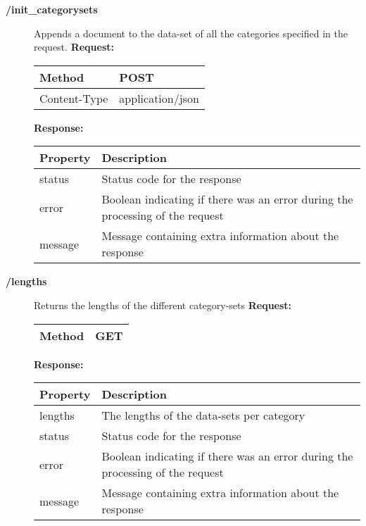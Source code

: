 \begin{description}
\item[\textbf{/init\_categorysets}]
Appends a document to the data-set of all the categories specified in the request.
\newline
\newline
\textbf{Request:}
\newline
\newline
\begin{tabular}{ | l | l |}
\hline
Method & POST\\ \hline
Content-Type & application/json\\ \hline
\end{tabular}
\newline
\newline
\textbf{Response:}
\newline
\newline
\resizebox{\textwidth}{!} {
\begin{tabular}{ | l | l |}
\hline
\textbf{Property} & \textbf{Description}\\ \hline
status & Status code for the response\\ \hline
error & Boolean indicating if there was an error during the processing of the request\\ \hline
message & Message containing extra information about the response\\ \hline
\end{tabular}}


\item[\textbf{/lengths}]
Returns the lengths of the different category-sets
\newline
\newline
\textbf{Request:}
\newline
\newline
\begin{tabular}{ | l | l |}
\hline
Method & GET\\ \hline
\end{tabular}
\newline
\newline
\textbf{Response:}
\newline
\newline
\resizebox{\textwidth}{!} {
\begin{tabular}{ | l | l |}
\hline
\textbf{Property} & \textbf{Description}\\ \hline
lengths & The lengths of the data-sets per category\\ \hline
status & Status code for the response\\ \hline
error & Boolean indicating if there was an error during the processing of the request\\ \hline
message & Message containing extra information about the response\\ \hline
\end{tabular}}

\end{description}
